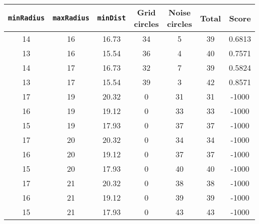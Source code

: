 \documentclass[letterpaper, 12pt]{article}
\begin{document}
\begin{longtable}{|c|c|c|c|c|c|c|}
\hline
\textbf{\texttt{minRadius}} & \textbf{\texttt{maxRadius}} & \textbf{\texttt{minDist}} & \textbf{Grid circles} & \textbf{Noise circles} & \textbf{Total} & \textbf{Score} \\
\hline
14 & 16 & 16.73 & 34 & 5 & 39 & 0.6813 \\
\hline
13 & 16 & 15.54 & 36 & 4 & 40 & 0.7571 \\
\hline
14 & 17 & 16.73 & 32 & 7 & 39 & 0.5824 \\
\hline
13 & 17 & 15.54 & 39 & 3 & 42 & 0.8571 \\
\hline
17 & 19 & 20.32 & 0 & 31 & 31 & -1000 \\
\hline
16 & 19 & 19.12 & 0 & 33 & 33 & -1000 \\
\hline
15 & 19 & 17.93 & 0 & 37 & 37 & -1000 \\
\hline
17 & 20 & 20.32 & 0 & 34 & 34 & -1000 \\
\hline
16 & 20 & 19.12 & 0 & 37 & 37 & -1000 \\
\hline
15 & 20 & 17.93 & 0 & 40 & 40 & -1000 \\
\hline
17 & 21 & 20.32 & 0 & 38 & 38 & -1000 \\
\hline
16 & 21 & 19.12 & 0 & 39 & 39 & -1000 \\
\hline
15 & 21 & 17.93 & 0 & 43 & 43 & -1000 \\
\hline
\end{longtable}
\end{document}
